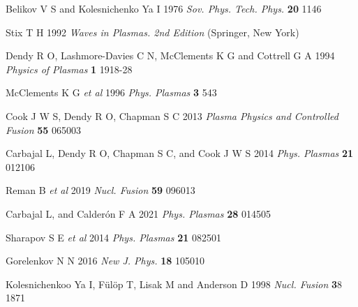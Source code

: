 \documentclass[12pt]{iopart}
\begin{document}
\begin{thebibliography}{9}
Belikov V S and Kolesnichenko Ya I 1976 \textit{Sov. Phys. Tech. Phys.} \textbf{20} 1146

Stix T H 1992 \textit{Waves in Plasmas. 2nd Edition} (Springer, New York)

Dendy R O, Lashmore-Davies C N, McClements K G and Cottrell G A 1994 \textit{Physics of Plasmas} \textbf{1} 1918-28

McClements K G \textit{et al} 1996 \textit{Phys. Plasmas} \textbf{3} 543

Cook J W S, Dendy R O, Chapman S C 2013 \textit{Plasma Physics and Controlled Fusion} \textbf{55} 065003

Carbajal L, Dendy R O, Chapman S C, and Cook J W S 2014 \textit{Phys. Plasmas} \textbf{21} 012106

Reman B \textit{et al} 2019 \textit{Nucl. Fusion} \textbf{59} 096013

Carbajal L, and Calderón F A 2021 \textit{Phys. Plasmas} \textbf{28} 014505

Sharapov S E \textit{et al} 2014 \textit{Phys. Plasmas} \textbf{21} 082501

Gorelenkov N N 2016 \textit{New J. Phys.} \textbf{18} 105010

Kolesnichenkoo Ya I, F{\"u}l{\"o}p T, Lisak M and Anderson D 1998 \textit{Nucl. Fusion} {\textbf 38} 1871


\end{thebibliography}
\end{document}
